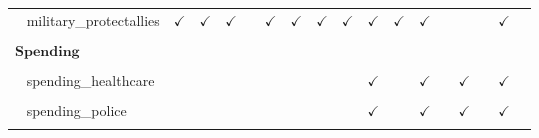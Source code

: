 \documentclass[
  12pt]{article}
\begin{document}
\begin{table}[H]
{\begin{tabular}{lcccccccccccccccc}
$\hspace{10pt}$military\_protectallies & $\checkmark$ & $\checkmark$ & $\checkmark$ &  & $\checkmark$ & $\checkmark$ & $\checkmark$ & $\checkmark$ & $\checkmark$ & $\checkmark$ & $\checkmark$ &  &  &  & $\checkmark$ & \\
\cellcolor{gray!6}{$\hspace{10pt}$military\_helpun} & \cellcolor{gray!6}{$\checkmark$} & \cellcolor{gray!6}{$\checkmark$} & \cellcolor{gray!6}{$\checkmark$} & \cellcolor{gray!6}{} & \cellcolor{gray!6}{$\checkmark$} & \cellcolor{gray!6}{$\checkmark$} & \cellcolor{gray!6}{$\checkmark$} & \cellcolor{gray!6}{$\checkmark$} & \cellcolor{gray!6}{$\checkmark$} & \cellcolor{gray!6}{$\checkmark$} & \cellcolor{gray!6}{$\checkmark$} & \cellcolor{gray!6}{} & \cellcolor{gray!6}{} & \cellcolor{gray!6}{} & \cellcolor{gray!6}{$\checkmark$} & \cellcolor{gray!6}{}\\
$\textbf{Spending}$ &  &  &  &  &  &  &  &  &  &  &  &  &  &  &  & \\
\cellcolor{gray!6}{$\hspace{10pt}$spending\_welfare} & \cellcolor{gray!6}{} & \cellcolor{gray!6}{} & \cellcolor{gray!6}{} & \cellcolor{gray!6}{} & \cellcolor{gray!6}{} & \cellcolor{gray!6}{} & \cellcolor{gray!6}{} & \cellcolor{gray!6}{} & \cellcolor{gray!6}{$\checkmark$} & \cellcolor{gray!6}{} & \cellcolor{gray!6}{$\checkmark$} & \cellcolor{gray!6}{} & \cellcolor{gray!6}{$\checkmark$} & \cellcolor{gray!6}{} & \cellcolor{gray!6}{$\checkmark$} & \cellcolor{gray!6}{}\\
$\hspace{10pt}$spending\_healthcare &  &  &  &  &  &  &  &  & $\checkmark$ &  & $\checkmark$ &  & $\checkmark$ &  & $\checkmark$ & \\
\cellcolor{gray!6}{$\hspace{10pt}$spending\_education} & \cellcolor{gray!6}{} & \cellcolor{gray!6}{} & \cellcolor{gray!6}{} & \cellcolor{gray!6}{} & \cellcolor{gray!6}{} & \cellcolor{gray!6}{} & \cellcolor{gray!6}{} & \cellcolor{gray!6}{} & \cellcolor{gray!6}{$\checkmark$} & \cellcolor{gray!6}{} & \cellcolor{gray!6}{$\checkmark$} & \cellcolor{gray!6}{} & \cellcolor{gray!6}{$\checkmark$} & \cellcolor{gray!6}{} & \cellcolor{gray!6}{$\checkmark$} & \cellcolor{gray!6}{}\\
$\hspace{10pt}$spending\_police &  &  &  &  &  &  &  &  & $\checkmark$ &  & $\checkmark$ &  & $\checkmark$ &  & $\checkmark$ & \\
\cellcolor{gray!6}{$\hspace{10pt}$spending\_infrastructure} & \cellcolor{gray!6}{} & \cellcolor{gray!6}{} & \cellcolor{gray!6}{} & \cellcolor{gray!6}{} & \cellcolor{gray!6}{} & \cellcolor{gray!6}{} & \cellcolor{gray!6}{} & \cellcolor{gray!6}{} & \cellcolor{gray!6}{$\checkmark$} & \cellcolor{gray!6}{} & \cellcolor{gray!6}{$\checkmark$} & \cellcolor{gray!6}{} & \cellcolor{gray!6}{$\checkmark$} & \cellcolor{gray!6}{} & \cellcolor{gray!6}{$\checkmark$} & \cellcolor{gray!6}{}\\

\end{tabular}}
\end{table}
\end{document}
